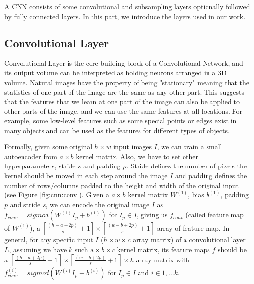 A CNN consists of some convolutional and subsampling layers optionally followed by fully connected layers. In this part, we introduce the layers used in our work.
\subsection{Convolutional Layer}
Convolutional Layer is the core building block of a Convolutional Network, and its output volume can be interpreted as holding neurons arranged in a 3D volume.
Natural images have the property of being "stationary" meaning that the statistics of one part of the image are the same as any other part. This suggests that the features that we learn at one part of the image can also be applied to other parts of the image, and we can use the same features at all locations. For example, some low-level features such as some special points or edges exist in many objects and can be used as the features for different types of objects.

Formally, given some original $h\times w$ input images $I$, we can train a small autoencoder from $a \times b$ kernel matrix. Also, we have to set other hyperparameters, stride $s$ and padding $p$. Stride defines the number of pixels the kernel should be moved in each step around the image $I$ and padding defines the number of rows/columns padded to the height and width of the original input (see Figure \ref{fig:cnn:conv}). 
Given a $a \times b$ kernel matrix $W^{(1)}$, bias $b^{(1)}$, padding $p$ and stride $s$, we can encode the original image $I$ as $f_{conv}=sigmod(W^{(1)}I_p+b^{(1)})$ for $I_p \in I$, giving us $f_{conv}$ (called feature map of $W^{(1)}$), a  $\left\lceil\frac{(h-a+2p)}{s}+1\right\rceil\times\left\lceil\frac{(w-b+2p)}{s}+1\right\rceil$ array of feature map. In general, for any specific input $I$ ($h \times w \times c$ array matrix) of a convolutional layer $L$, assuming we have $k$ such $a \times b \times c$ kernel matrix, its feature maps $f$ should be a $\left\lceil\frac{(h-a+2p)}{s}+1\right\rceil\times\left\lceil\frac{(w-b+2p)}{s}+1\right\rceil \times k$ array matrix with $f_{conv}^{(i)}=sigmod(W^{(i)}I_p+b^{(i)})$ for $I_p \in I$ and $i \in 1,\dots k$.

